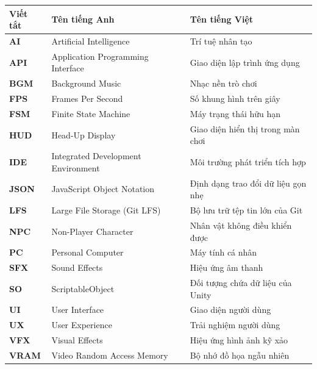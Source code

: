 \documentclass[../DoAn.tex]{subfiles}
\begin{document}
\begin{longtable}{l p{7.5cm} p{5.5cm}}
	\hline
   \textbf{Viết tắt}  & \textbf{Tên tiếng Anh}	& \textbf{Tên tiếng Việt} \\ \hline 
	\textbf{AI} & Artificial Intelligence & Trí tuệ nhân tạo\\
	\textbf{API} & Application Programming Interface & Giao diện lập trình ứng dụng\\
	\textbf{BGM} & Background Music & Nhạc nền trò chơi\\
	\textbf{FPS} & Frames Per Second & Số khung hình trên giây\\
	\textbf{FSM} & Finite State Machine & Máy trạng thái hữu hạn\\
	\textbf{HUD} & Head-Up Display & Giao diện hiển thị trong màn chơi\\
	\textbf{IDE} & Integrated Development Environment & Môi trường phát triển tích hợp\\
	\textbf{JSON} & JavaScript Object Notation & Định dạng trao đổi dữ liệu gọn nhẹ\\
	\textbf{LFS} & Large File Storage (Git LFS) & Bộ lưu trữ tệp tin lớn của Git\\
	\textbf{NPC} & Non-Player Character & Nhân vật không điều khiển được\\
	\textbf{PC} & Personal Computer & Máy tính cá nhân\\
	\textbf{SFX} & Sound Effects & Hiệu ứng âm thanh\\
	\textbf{SO} & ScriptableObject & Đối tượng chứa dữ liệu của Unity\\
	\textbf{UI} & User Interface & Giao diện người dùng\\
	\textbf{UX} & User Experience & Trải nghiệm người dùng\\
	\textbf{VFX} & Visual Effects & Hiệu ứng hình ảnh kỹ xảo\\
	\textbf{VRAM} & Video Random Access Memory & Bộ nhớ đồ họa ngẫu nhiên\\
    \hline
\end{longtable}
\end{document}
